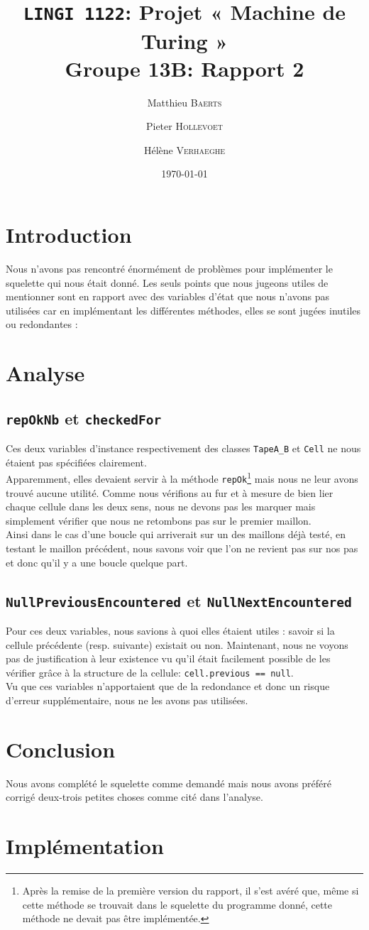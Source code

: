 \documentclass[a4paper,11pt]{article}
\title{\texttt{LINGI 1122}: Projet « Machine de Turing » \\ {\large Groupe 13B: Rapport 2}}
\author{Matthieu \textsc{Baerts} \and Pieter \textsc{Hollevoet} \and Hélène \textsc{Verhaeghe}}
\date{\today}
\begin{document}
\maketitle


\section*{Introduction}
Nous n'avons pas rencontré énormément de problèmes pour implémenter le squelette qui nous était donné. Les seuls points que nous jugeons utiles de mentionner sont en rapport avec des variables d'état que nous n'avons pas utilisées car en implémentant les différentes méthodes, elles se sont jugées inutiles ou redondantes :

\section{Analyse}
\subsection{\texttt{repOkNb} et \texttt{checkedFor}}
Ces deux variables d'instance respectivement des classes \texttt{TapeA\_B} et \texttt{Cell} ne nous étaient pas spécifiées clairement.\\
Apparemment, elles devaient servir à la méthode \texttt{repOk}\footnote{Après la remise de la première version du rapport, il s'est avéré que, même si cette méthode se trouvait dans le squelette du programme donné, cette méthode ne devait pas être implémentée.} mais nous ne leur avons trouvé aucune utilité. Comme nous vérifions au fur et à mesure de bien lier chaque cellule dans les deux sens, nous ne devons pas les marquer mais simplement vérifier que nous ne retombons pas sur le premier maillon.\\
Ainsi dans le cas d'une boucle qui arriverait sur un des maillons déjà testé, en testant le maillon précédent, nous savons voir que l'on ne revient pas sur nos pas et donc qu'il y a une boucle quelque part.

\subsection{\texttt{NullPreviousEncountered} et \texttt{NullNextEncountered}}
Pour ces deux variables, nous savions à quoi elles étaient utiles : savoir si la cellule précédente (resp. suivante) existait ou non. Maintenant, nous ne voyons pas de justification à leur existence vu qu'il était facilement possible de les vérifier grâce à la structure de la cellule: \texttt{cell.previous == null}.\\
Vu que ces variables n'apportaient que de la redondance et donc un risque d'erreur supplémentaire, nous ne les avons pas utilisées.

\section*{Conclusion}
Nous avons complété le squelette comme demandé mais nous avons préféré corrigé deux-trois petites choses comme cité dans l'analyse.

\appendix
\section{Implémentation}

\end{document}

